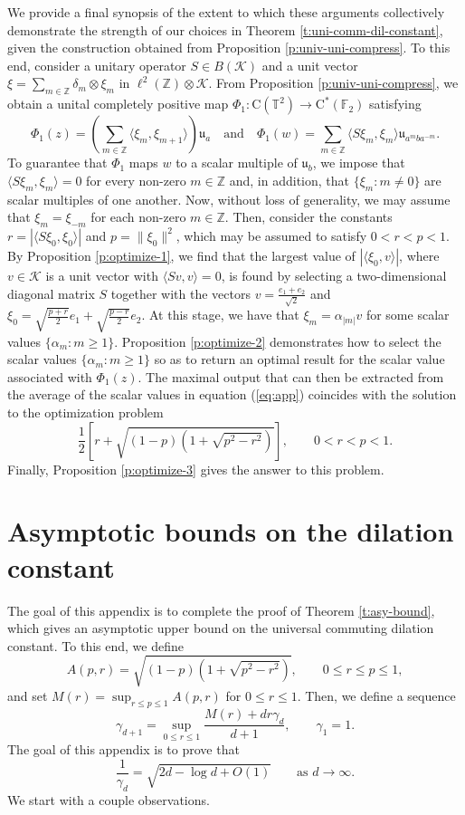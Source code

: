 \documentclass[10pt]{amsart}
\newcommand{\bF}{{\mathbb{F}}}
\newcommand{\bT}{{\mathbb{T}}}
\newcommand{\bZ}{{\mathbb{Z}}}
\newcommand{\K}{{\mathcal{K}}}
\newcommand{\rC}{\mathrm{C}}
\begin{document}
We provide a final synopsis of the extent to which these arguments collectively demonstrate the strength of our choices in Theorem \ref{t:uni-comm-dil-constant}, given the construction obtained from Proposition \ref{p:univ-uni-compress}. To this end, consider a unitary operator $S\in B(\K)$ and a unit vector $\xi = \sum_{m\in\bZ}\delta_m\otimes\xi_m$ in $\ell^2(\bZ)\otimes\K$. From Proposition \ref{p:univ-uni-compress}, we obtain a unital completely positive map $\Phi_1:\rC(\bT^2)\rightarrow\rC^*(\bF_2)$ satisfying
\begin{equation}\label{eq:app}
    \Phi_1(z) = \left( \sum_{m\in\bZ}\langle \xi_m, \xi_{m+1}\rangle \right)\mathfrak{u}_a \quad \text{and} \quad \Phi_1(w) = \sum_{m\in\bZ}\langle S\xi_m, \xi_m\rangle \mathfrak{u}_{a^mba^{-m}}.
\end{equation}
To guarantee that $\Phi_1$ maps $w$ to a scalar multiple of $\mathfrak{u}_b$, we impose that $\langle S\xi_m, \xi_m\rangle = 0$ for every non-zero $m\in\bZ$ and, in addition, that $\{\xi_m: m\neq 0\}$ are scalar multiples of one another. Now, without loss of generality, we may assume that $\xi_m = \xi_{-m}$ for each non-zero $m\in\bZ$. Then, consider the constants $r=|\langle S\xi_0, \xi_0\rangle|$ and $p= \|\xi_0\|^2$, which may be assumed to satisfy $0<r < p< 1$. By Proposition \ref{p:optimize-1}, we find that the largest value of $|\langle \xi_0, v\rangle|$, where $v\in\K$ is a unit vector with $\langle Sv, v\rangle =0$, is found by selecting a two-dimensional diagonal matrix $S$ together with the vectors $v= \frac{e_1+e_2}{\sqrt{2}}$ and $\xi_0 = \sqrt{\frac{p+r}{2}}e_1 + \sqrt{\frac{p-r}{2}}e_2$. At this stage, we have that $\xi_m = \alpha_{|m|}v$ for some scalar values $\{\alpha_m : m\geq 1\}$. Proposition \ref{p:optimize-2} demonstrates how to select the scalar values $\{\alpha_m : m\geq 1\}$ so as to return an optimal result for the scalar value associated with $\Phi_1(z)$. The maximal output that can then be extracted from the average of the scalar values in equation (\ref{eq:app}) coincides with the solution to the optimization problem
\[
    \frac{1}{2}\left[ r+ \sqrt{(1-p)(1+\sqrt{p^2-r^2})} \right], \qquad 0<r<p<1.
\]
Finally, Proposition \ref{p:optimize-3} gives the answer to this problem.


\section{Asymptotic bounds on the dilation constant}\label{s:recursion}

The goal of this appendix is to complete the proof of Theorem \ref{t:asy-bound}, which gives an asymptotic upper bound on the universal commuting dilation constant. To this end, we define
\[
    A(p,r) = \sqrt{(1-p)(1+\sqrt{p^2-r^2})}, \qquad 0\leq r\leq p\leq 1,
\]
and set $M(r) = \sup_{r\leq p\leq 1} A(p,r)$ for $0\leq r\leq 1$. Then, we define a sequence
\[
    \gamma_{d+1} = \sup_{0\leq r \leq 1}\frac{M(r) + dr\gamma_d}{d+1}, \qquad \gamma_1=1.
\]
The goal of this appendix is to prove that
\[
    \frac{1}{\gamma_d} = \sqrt{2d-\log d + O(1)} \quad \quad \text{as $d\rightarrow\infty$}.
\]
We start with a couple observations.
\end{document}
